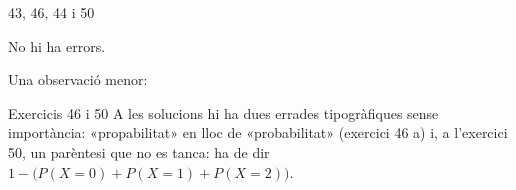 
%
        {43, 46, 44 i 50}

\noindent
No hi ha errors.


\ifobs
\bigskip
\noindent
Una observació menor:\par\nopagebreak

\begin{observacio}{Exercicis 46 i 50}
  A les solucions hi ha dues errades tipogràfiques sense importància:
  «propabilitat» en lloc de «probabilitat» (exercici 46 a) i, a l'exercici 50,
  un parèntesi que no es tanca: ha de dir
  $1-\bigl(P(X=0)+P(X=1)+P(X=2)\bigr)$.
\end{observacio}
\fi
